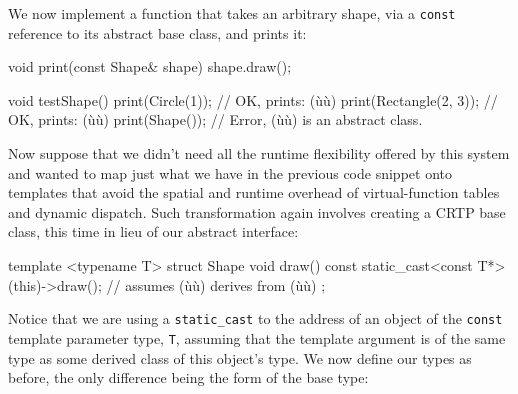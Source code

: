 We now implement a function that takes an arbitrary shape, via a
\lstinline!const!  reference to its abstract base class, and
prints it:

\begin{emcppslisting}[emcppsbatch=e6]
void print(const Shape& shape)
{
    shape.draw();
}

void testShape()
{
    print(Circle(1));        // OK, prints: (ù{}ù)
    print(Rectangle(2, 3));  // OK, prints: (ù{}ù)
    print(Shape());          // Error, (ù{}ù) is an abstract class.
}
\end{emcppslisting}

\noindent Now suppose that we didn't need all the runtime flexibility offered by
this system and wanted to map just what we have in the previous code
snippet onto templates that avoid the spatial and runtime overhead of
virtual-function tables and dynamic dispatch. Such transformation again
involves creating a CRTP base class, this time in lieu of our abstract
interface:

\begin{emcppslisting}[emcppsbatch=e7]
template <typename T>
struct Shape
{
    void draw() const
    {
        static_cast<const T*>(this)->draw();  // assumes (ù{}ù) derives from (ù{}ù)
    }
};
\end{emcppslisting}

\noindent Notice that we are using a \lstinline!static_cast! to the address of an
object of the \lstinline!const! template parameter type, \lstinline!T!,
assuming that the template argument is of the same type as some derived
class of this object's type. We now define our types as before, the only
difference being the form of the base type:

